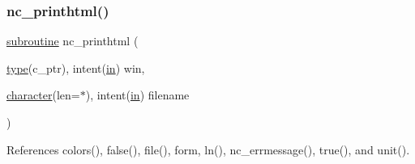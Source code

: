 \subsubsection{\texorpdfstring{nc\+\_\+printhtml()}{nc\_printhtml()}}
{\footnotesize\ttfamily \hyperlink{M__stopwatch_83_8txt_acfbcff50169d691ff02d4a123ed70482}{subroutine} nc\+\_\+printhtml (\begin{DoxyParamCaption}\item[{\hyperlink{stop__watch_83_8txt_a70f0ead91c32e25323c03265aa302c1c}{type}(c\+\_\+ptr), intent(\hyperlink{M__journal_83_8txt_afce72651d1eed785a2132bee863b2f38}{in})}]{win,  }\item[{\hyperlink{option__stopwatch_83_8txt_abd4b21fbbd175834027b5224bfe97e66}{character}(len=$\ast$), intent(\hyperlink{M__journal_83_8txt_afce72651d1eed785a2132bee863b2f38}{in})}]{filename }\end{DoxyParamCaption})}



References colors(), false(), file(), form, ln(), nc\+\_\+errmessage(), true(), and unit().

